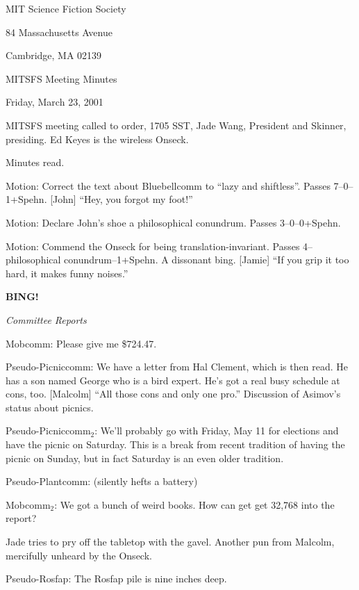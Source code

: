 \documentclass[12pt]{article}
\newcommand{\bing}{{\bf BING!} }
\newcommand{\goto}[1]{\bing \vskip 12pt \centerline{{\em{#1}}}}
\begin{document}
\begin{center}

MIT Science Fiction Society 

84 Massachusetts Avenue

Cambridge, MA 02139

\vspace{12pt}

MITSFS Meeting Minutes 

Friday, March 23, 2001

\end{center}
 
\vspace{18pt}

\setlength{\parskip}{6pt}

\noindent
MITSFS meeting called to order, 1705 SST, Jade Wang, President and
Skinner, presiding.  Ed Keyes is the wireless Onseck.

Minutes read.

Motion: Correct the text about Bluebellcomm to ``lazy and shiftless''.
Passes 7--0--1+Spehn.  [John] ``Hey, you forgot my foot!''

Motion: Declare John's shoe a philosophical conundrum.  Passes
3--0--0+Spehn.

Motion: Commend the Onseck for being translation-invariant.  Passes
4--philosophical conundrum--1+Spehn.  A dissonant bing.  [Jamie]
``If you grip it too hard, it makes funny noises.''

\goto{Committee Reports}

Mobcomm: Please give me \$724.47.

Pseudo-Picniccomm: We have a letter from Hal Clement, which is then
read.  He has a son named George who is a bird expert.  He's got a
real busy schedule at cons, too.  [Malcolm] ``All those cons and only
one pro.''  Discussion of Asimov's status about picnics.

Pseudo-Picniccomm$_2$: We'll probably go with Friday, May 11 for
elections and have the picnic on Saturday.  This is a break from recent
tradition of having the picnic on Sunday, but in fact Saturday is an
even older tradition.

Pseudo-Plantcomm: (silently hefts a battery)

Mobcomm$_2$: We got a bunch of weird books.  How can get get 32,768
into the report?

Jade tries to pry off the tabletop with the gavel.  Another pun from
Malcolm, mercifully unheard by the Onseck.

Pseudo-Rosfap: The Rosfap pile is nine inches deep.
\end{document}
